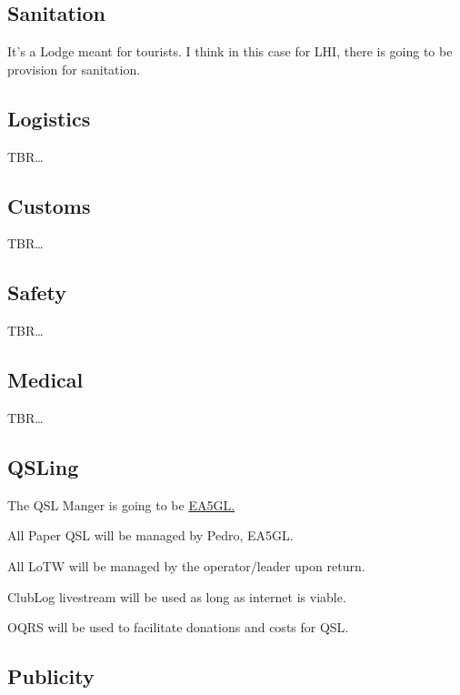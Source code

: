 \documentclass[11pt]{article}
\begin{document}
\subsection{Sanitation}

It's a Lodge meant for tourists.  I think in this case for LHI, there
is going to be provision for sanitation.

\subsection{Logistics}

TBR\ldots

\subsection{Customs}

TBR\ldots

\subsection{Safety}
TBR\ldots

\subsection{Medical}
TBR\ldots

\subsection{QSLing}

The QSL Manger is going to be \href{https://www.qrz.com/db/EA5GL}{EA5GL.}
\par
All Paper QSL will be managed by Pedro, EA5GL.
\par
All LoTW will be managed by the operator/leader upon return.
\par
ClubLog livestream will be used as long as internet is viable.
\par
OQRS will be used to facilitate donations and costs for QSL.

\subsection{Publicity}
\end{document}

